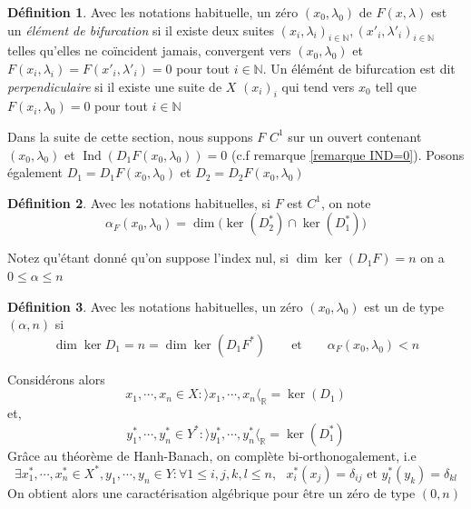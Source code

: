 \documentclass[a4paper,12pt,oneside,titlepage]{article}
\newcommand{\R}[0]{\mathbb{R}}
\theoremstyle{definition}
\newtheorem{definition}{Définition}[section]
\theoremstyle{plain}
\begin{document}
\begin{definition}
    Avec les notations habituelle, un zéro $(x_0,\lambda_0)$ de $F(x,\lambda)$ est un \textit{élément de bifurcation}  si il existe deux suites $(x_i,\lambda_i)_{i\in\mathbb{N}},(x'_i,\lambda'_i)_{i\in\mathbb{N}}$ telles qu'elles ne coïncident jamais, convergent vers $(x_0,\lambda_0)$ et 
    $F(x_i,\lambda_i)=F(x'_i,\lambda'_i)=0$ pour tout $i\in\mathbb{N}$. Un élémént de bifurcation est dit \textit{perpendiculaire} si il existe une suite de $X$ $(x_i)_i$ qui tend vers $x_0$ tell que $F(x_i,\lambda_0)=0$ pour tout $i\in\mathbb{N}$
\end{definition}
Dans la suite de cette section, nous suppons $F$ $C^1$ sur un ouvert contenant $(x_0,\lambda_0)$ et  $\operatorname{Ind}(D_1F(x_0,\lambda_0))=0$ (c.f remarque \ref{remarque IND=0}). Posons également $D_1=D_1F(x_0,\lambda_0)$ et $D_2=D_2F(x_0,\lambda_0)$
\begin{definition}
    Avec les notations habituelles, si $F$ est $C^1$, on note 
    \begin{equation*}
        \alpha_{F}(x_0,\lambda_0)= \dim \big(\ker (D_2^{*})\cap \ker (D_1^{*})\big)
    \end{equation*}
\end{definition} 
Notez qu'étant donné qu'on suppose l'index nul, si  $\dim \ker(D_1 F)=n$ on a $0\leq \alpha\leq n$

\begin{definition}
    Avec les notations habituelles, un zéro $(x_0,\lambda_0)$ est un de type $(\alpha,n)$ si
    \begin{equation*}
        \dim \ker D_1=n=\dim \ker(D_1 F^{*})\qquad  \text{et}\qquad   \alpha_F(x_0,\lambda_0)<n
    \end{equation*}
\end{definition}

Considérons alors 
\begin{equation*}
    x_1,\cdots,x_n\in X : \rangle x_1,\cdots,x_n\langle_{\R}=\ker(D_1)
\end{equation*}
et, 
\begin{equation*}
     y^{*}_1,\cdots,y^{*}_n\in Y^{*}: \rangle y^{*}_1,\cdots, y^{*}_{n}  \langle_{\R}=\ker(D_1^{*})
\end{equation*}
Grâce au théorème de Hanh-Banach, on complète bi-orthonogalement, i.e 
\begin{equation}\label{BasebiOrtho}
    \exists x^{*}_1,\cdots,x^{*}_n\in X^{*}, y_1,\cdots,y_n\in Y : \forall 1\leq i,j,k,l\leq n,\text{  } x_i^{*}(x_j)=\delta_{ij}\text{ et } y_l^{*}(y_k)=\delta_{kl}
\end{equation}
On obtient alors une caractérisation algébrique pour être un zéro de type $(0,n)$
\end{document}

